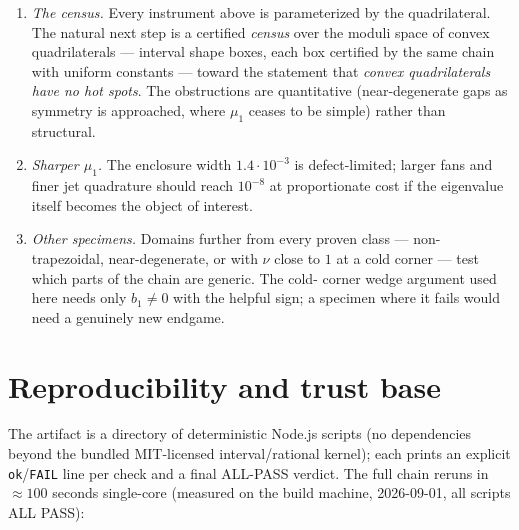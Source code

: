 \documentclass[11pt]{article}
\begin{document}
\begin{enumerate}
\item \emph{The census.} Every instrument above is parameterized by the
quadrilateral. The natural next step is a certified \emph{census} over
the moduli space of convex quadrilaterals --- interval shape boxes,
each box certified by the same chain with uniform constants --- toward
the statement that \emph{convex quadrilaterals have no hot spots}. The
obstructions are quantitative (near-degenerate gaps as symmetry is
approached, where $\mu_1$ ceases to be simple) rather than structural.
\item \emph{Sharper $\mu_1$.} The enclosure width $1.4\cdot10^{-3}$ is
defect-limited; larger fans and finer jet quadrature should reach
$10^{-8}$ at proportionate cost if the eigenvalue itself becomes the
object of interest.
\item \emph{Other specimens.} Domains further from every proven class
--- non-trapezoidal, near-degenerate, or with $\nu$ close to $1$ at a
cold corner --- test which parts of the chain are generic. The cold-%
corner wedge argument used here needs only $b_1\ne0$ with the helpful
sign; a specimen where it fails would need a genuinely new endgame.
\end{enumerate}


\appendix

\section{Reproducibility and trust base}\label{app:repro}

The artifact is a directory of deterministic Node.js scripts (no
dependencies beyond the bundled MIT-licensed interval/rational kernel);
each prints an explicit \texttt{ok}/\texttt{FAIL} line per check and a
final ALL-PASS verdict. The full chain reruns in ${\approx}100$ seconds
single-core (measured on the build machine, 2026-09-01, all scripts
ALL PASS):
\end{document}
